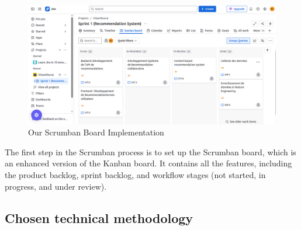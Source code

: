 \begin{center}
\begin{figure}[H]
            \centering
            \includegraphics[scale=0.38]{images/kanbanBoard.png}
            \caption{Our Scrumban Board Implementation}
            \label{fig:Tableau_Scrumban}
\end{figure}
\end{center}

The first step in the Scrumban process is to set up the Scrumban board, which is an enhanced version of the Kanban board. It contains all the features, including the product backlog, sprint backlog, and workflow stages (not started, in progress, and under review).




\newpage
\subsection{Chosen technical methodology}

